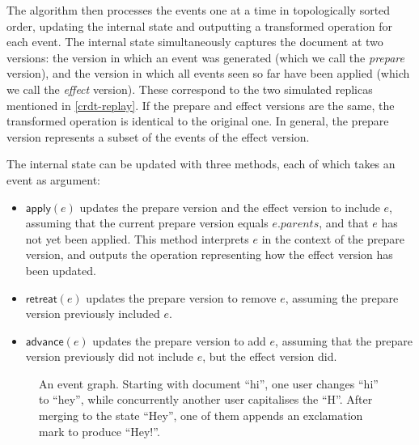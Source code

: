 \documentclass[sigplan,10pt]{acmart}
\begin{document}
The algorithm then processes the events one at a time in topologically sorted order, updating the internal state and outputting a transformed operation for each event.
The internal state simultaneously captures the document at two versions: the version in which an event was generated (which we call the \emph{prepare} version), and the version in which all events seen so far have been applied (which we call the \emph{effect} version).
These correspond to the two simulated replicas mentioned in \autoref{crdt-replay}.
If the prepare and effect versions are the same, the transformed operation is identical to the original one.
In general, the prepare version represents a subset of the events of the effect version.

The internal state can be updated with three methods, each of which takes an event as argument:

\begin{itemize}
\item $\mathsf{apply}(e)$ updates the prepare version and the effect version to include $e$, assuming that the current prepare version equals $e.\mathit{parents}$, and that $e$ has not yet been applied. This method interprets $e$ in the context of the prepare version, and outputs the operation representing how the effect version has been updated.
\item $\mathsf{retreat}(e)$ updates the prepare version to remove $e$, assuming the prepare version previously included $e$.
\item $\mathsf{advance}(e)$ updates the prepare version to add $e$, assuming that the prepare version previously did not include $e$, but the effect version did.
\end{itemize}

\begin{figure}
  \caption{An event graph. Starting with document ``hi'', one user changes ``hi'' to ``hey'', while concurrently another user capitalises the ``H''. After merging to the state ``Hey'', one of them appends an exclamation mark to produce ``Hey!''.}
  \label{graph-hi-hey}
\end{figure}
\end{document}
